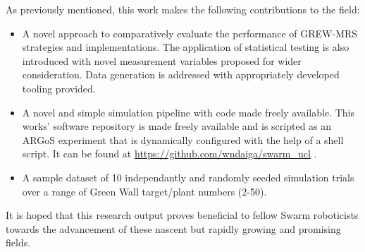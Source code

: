 \documentclass{report}
\begin{document}
As previously mentioned, this work makes the following contributions to the field:

\begin{itemize}
	\item A novel approach to comparatively evaluate the performance of GREW-MRS strategies and implementations. The application of statistical testing is also introduced with novel measurement variables proposed for wider consideration. Data generation is addressed with appropriately developed tooling provided.
	\item A novel and simple simulation pipeline with code made freely available. This works' software repository is made freely available and is scripted as an ARGoS experiment that is dynamically configured with the help of a shell script. It can be found at \url{https://github.com/wndaiga/swarm_ucl} \cite{SWARMCODE}.
	\item A sample dataset of 10 independantly and randomly seeded simulation trials over a range of Green Wall target/plant numbers (2-50).
\end{itemize}

It is hoped that this research output proves beneficial to fellow Swarm roboticists towards the advancement of these nascent but rapidly growing and promising fields.

\appendix



\newpage
{}
\end{document}
